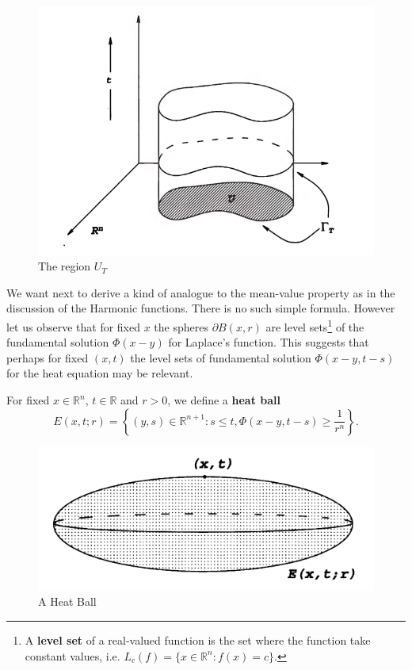 \begin{figure}[htbp]
    \center
    \includegraphics[scale=0.49]{Image/Parabolic Cylinder.png}
    \caption{The region $U_T$}
\end{figure}
We want next to derive a kind of analogue to the mean-value property as in the discussion of the Harmonic functions. There is no such simple formula. However let us observe that for fixed $x$ the spheres $\partial B(x,r)$ are level sets\footnote{A \textbf{level set} of a real-valued function is the set where the function take constant values, i.e. $L_c(f)=\{x\in\mathbb{R}^n:f(x)= c\}$.} of the fundamental solution $\Phi(x-y)$ for Laplace's function. This suggests that perhaps for fixed $(x,t)$ the level sets of fundamental solution $\Phi(x-y,t-s)$ for the heat equation may be relevant.
\begin{definition}
For fixed $x\in\mathbb{R}^n$, $t\in\mathbb{R}$ and $r>0$, we define a \textbf{heat ball}
$$
E\left( x,t;r \right) =\left\{ \left( y,s \right) \in \mathbb{R} ^{n+1}:s\le t,\Phi \left( x-y,t-s \right) \ge \frac{1}{r^n} \right\} .
$$
\end{definition}
\begin{figure}[htbp]
    \center
    \includegraphics[scale=0.49]{Image/Heat Ball.png}
    \caption{A Heat Ball}
\end{figure}
